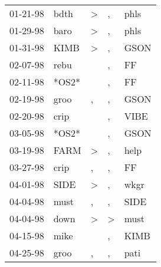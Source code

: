 \begin{supertabular}{p{0.07\textwidth}p{0.06\textwidth}p{0.02\textwidth}p{0.02\textwidth}p{0.06\textwidth}}
          01-21-98\textsuperscript{} &  bdth\textsuperscript{} &  \textgreater &             , &  phls\textsuperscript{} \\
          01-29-98\textsuperscript{} &  baro\textsuperscript{} &  \textgreater &             , &  phls\textsuperscript{} \\
          01-31-98\textsuperscript{} &  KIMB\textsuperscript{} &  \textgreater &             , &  GSON\textsuperscript{} \\
          02-07-98\textsuperscript{} &  rebu\textsuperscript{} &               &             , &    FF\textsuperscript{} \\
          02-11-98\textsuperscript{} &                   *OS2* &               &             , &    FF\textsuperscript{} \\
          02-19-98\textsuperscript{} &  groo\textsuperscript{} &             , &             , &  GSON\textsuperscript{} \\
          02-20-98\textsuperscript{} &  crip\textsuperscript{} &               &             , &  VIBE\textsuperscript{} \\
          03-05-98\textsuperscript{} &                   *OS2* &               &             , &  GSON\textsuperscript{} \\
          03-19-98\textsuperscript{} &  FARM\textsuperscript{} &  \textgreater &             , &  help\textsuperscript{} \\
          03-27-98\textsuperscript{} &  crip\textsuperscript{} &             , &             , &    FF\textsuperscript{} \\
          04-01-98\textsuperscript{} &  SIDE\textsuperscript{} &  \textgreater &             , &  wkgr\textsuperscript{} \\
          04-04-98\textsuperscript{} &  must\textsuperscript{} &             , &             , &  SIDE\textsuperscript{} \\
          04-04-98\textsuperscript{} &  down\textsuperscript{} &  \textgreater &  \textgreater &  must\textsuperscript{} \\
          04-15-98\textsuperscript{} &  mike\textsuperscript{} &               &             , &  KIMB\textsuperscript{} \\
          04-25-98\textsuperscript{} &  groo\textsuperscript{} &             , &             , &  pati\textsuperscript{} \\

\end{supertabular}
